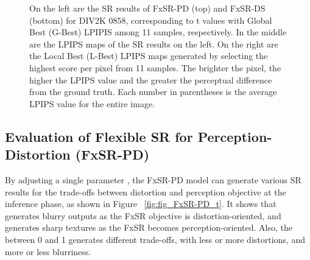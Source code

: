 \documentclass{article}
\begin{document}
\begin{figure*}[!t]
\centering
\begin{minipage}[t]{1.0\linewidth}
    \centering
    \hfill
    \hfill
    \vfill
    \vspace{0.3cm}

    \hfill
    \hfill
    \vfill
    \vspace{0.3cm}
    
\end{minipage}
\caption{On the left are the SR results of FxSR-PD (top) and FxSR-DS (bottom) for DIV2K 0858, corresponding to t values with Global Best (G-Best) LPIPIS among 11 samples, respectively. In the middle are the LPIPS maps of the SR results on the left. On the right are the Local Best (L-Best) LPIPS maps generated by selecting the highest score per pixel from 11 samples. The brighter the pixel, the higher the LPIPS value and the greater the perceptual difference from the ground truth. Each number in parentheses is the average LPIPS value for the entire image.}
\label{fig:fig_DS_DIV_LOC}
\end{figure*}

\subsection{Evaluation of Flexible SR for Perception-Distortion (FxSR-PD)}
By adjusting a single parameter , the FxSR-PD model can generate various SR results for the trade-offs between distortion and perception objective at the inference phase, as shown in Figure ~\ref{fig:fig_FxSR-PD_t}. It shows that  generates blurry outputs as the FxSR objective is distortion-oriented, and  generates sharp textures as the FxSR becomes perception-oriented. Also, the  between 0 and 1 generates different trade-offs, with less or more distortions, and more or less blurriness.
\end{document}

